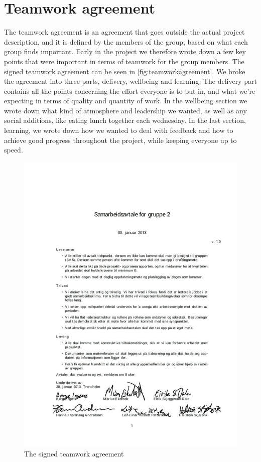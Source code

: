 \section{Teamwork agreement}
The teamwork agreement is an agreement that goes outside the actual project description, and it is defined by the members of the group, based on what each group finds important. Early in the project we therefore wrote down a few key points that were important in terms of teamwork for the group members. The signed teamwork agreement can be seen in \autoref{fig:teamworkagreement}. We broke the agreement into three parts, delivery, wellbeing and learning. The delivery part contains all the points concerning the effort everyone is to put in, and what we're expecting in terms of quality and quantity of work. In the wellbeing section we wrote down what kind of atmosphere and leadership we wanted, as well as any social additions, like eating lunch together each wednesday. In the last section, learning, we wrote down how we wanted to deal with feedback and how to achieve good progress throughout the project, while keeping everyone up to speed.

\begin{figure}
	\begin{center}
		\includegraphics[width=1.0\textwidth]{Figures/teamworkagreement.pdf}
	\end{center}
	\caption[Teamwork agreement]{The signed teamwork agreement}
	\label{fig:teamworkagreement}
\end{figure}